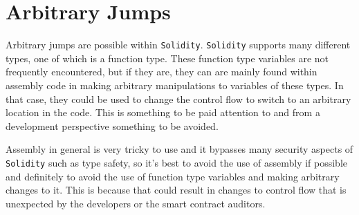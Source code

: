 \section{Arbitrary Jumps}\label{arbitrary-jumps}

Arbitrary jumps are possible within \texttt{Solidity}. \texttt{Solidity}
supports many different types, one of which is a function type. These
function type variables are not frequently encountered, but if they are,
they can are mainly found within assembly code in making arbitrary
manipulations to variables of these types. In that case, they could be
used to change the control flow to switch to an arbitrary location in
the code. This is something to be paid attention to and from a
development perspective something to be avoided.

Assembly in general is very tricky to use and it bypasses many security
aspects of \texttt{Solidity} such as type safety, so it's best to avoid
the use of assembly if possible and definitely to avoid the use of
function type variables and making arbitrary changes to it. This is
because that could result in changes to control flow that is unexpected
by the developers or the smart contract auditors.
